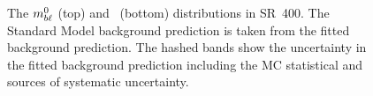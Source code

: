 \begin{figure}[ht]
  \centering
  \caption[
    The $\MBL^0$ (top) and \HT\ (bottom) distributions in SR~400.
  ]{
    The $\MBL^0$ (top) and \HT\ (bottom) distributions in SR~400.
    The Standard Model background prediction is taken from the fitted
    background prediction.
    The hashed bands show the uncertainty in the fitted background prediction
    including the MC statistical and sources of systematic uncertainty.
  }
  \label{fig:sr_dists}
\end{figure}

